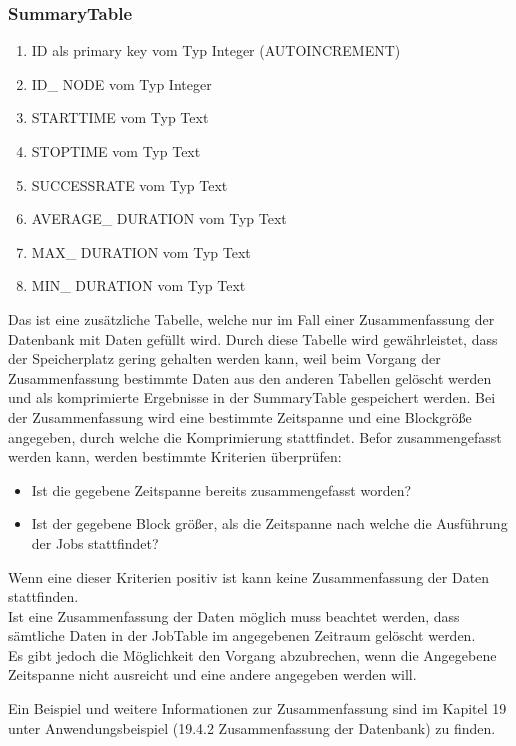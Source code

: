 \documentclass[12pt,a4paper]{report}
\begin{document}
\begin{onehalfspace}
\subsubsection{SummaryTable}
\begin{enumerate}
\item ID als primary key vom Typ Integer (AUTOINCREMENT)
\item ID\_ NODE vom Typ Integer
\item STARTTIME vom Typ Text
\item STOPTIME vom Typ Text
\item SUCCESSRATE vom Typ Text
\item AVERAGE\_ DURATION vom Typ Text
\item MAX\_ DURATION vom Typ Text
\item MIN\_ DURATION vom Typ Text
\end{enumerate}
Das ist eine zusätzliche Tabelle, welche nur im Fall einer Zusammenfassung der Datenbank mit Daten gefüllt wird.  Durch diese Tabelle wird gewährleistet, dass der Speicherplatz gering gehalten werden kann, weil beim Vorgang der Zusammenfassung bestimmte Daten aus den anderen Tabellen gelöscht werden und als komprimierte Ergebnisse in der SummaryTable gespeichert werden. Bei der Zusammenfassung wird eine bestimmte Zeitspanne und eine Blockgröße angegeben, durch welche die Komprimierung stattfindet. Befor zusammengefasst werden kann, werden bestimmte Kriterien überprüfen:
\begin{itemize}
\item Ist die gegebene Zeitspanne bereits zusammengefasst worden?
\item Ist der gegebene Block größer, als die Zeitspanne nach welche die Ausführung der Jobs stattfindet?
\end{itemize}
Wenn eine dieser Kriterien positiv ist kann keine Zusammenfassung der Daten stattfinden.
\\Ist eine Zusammenfassung der Daten möglich muss beachtet werden, dass sämtliche Daten in der JobTable im angegebenen Zeitraum gelöscht werden.\\

Es gibt jedoch die Möglichkeit den Vorgang abzubrechen, wenn die Angegebene Zeitspanne nicht ausreicht und eine andere angegeben werden will.

Ein Beispiel und weitere Informationen zur Zusammenfassung sind im Kapitel 19 unter Anwendungsbeispiel (19.4.2 Zusammenfassung der Datenbank) zu finden.


\end{onehalfspace}
\end{document}
